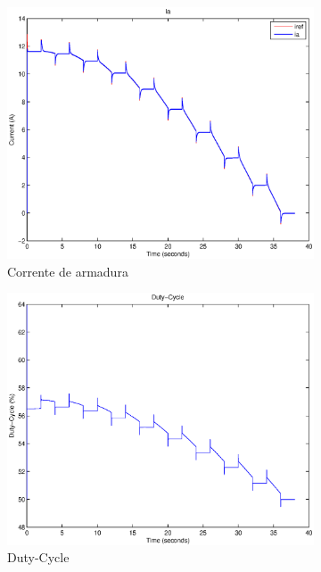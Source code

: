 \documentclass{article}
\begin{document}
\begin{figure}[H]
\begin{subfigure}{0.32\textwidth}
		\includegraphics[width=\linewidth]{matlab/ia6}
		\caption{Corrente de armadura}
	\end{subfigure}
	\begin{subfigure}{0.32\textwidth}
		\includegraphics[width=\linewidth]{matlab/d6}
		\caption{Duty-Cycle}
	\end{subfigure}
	\begin{subfigure}{0.32\textwidth}

\end{subfigure}
\end{figure}
\end{document}
